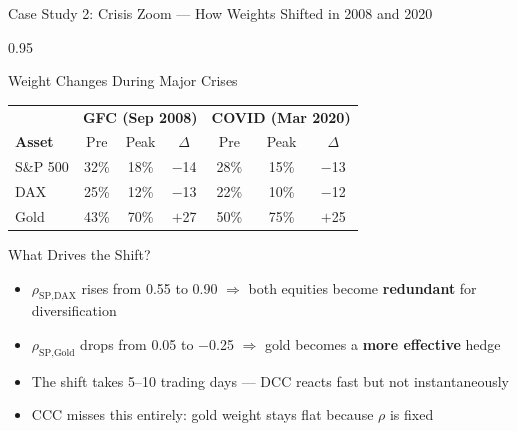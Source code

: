 \documentclass[9pt, aspectratio=169, t]{beamer}
\begin{document}
\begin{frame}{Case Study 2: Crisis Zoom --- How Weights Shifted in 2008 and 2020}
    \begin{cminipage}{0.95\textwidth}
    {\footnotesize
    \begin{block}{Weight Changes During Major Crises}
        \vspace{0.1cm}
        {\small
        \begin{center}
        \begin{tabular}{l|ccc|ccc}
            \hline
            & \multicolumn{3}{c|}{\textbf{GFC (Sep 2008)}} & \multicolumn{3}{c}{\textbf{COVID (Mar 2020)}} \\
            \textbf{Asset} & Pre & Peak & $\Delta$ & Pre & Peak & $\Delta$ \\
            \hline
            S\&P 500 & 32\% & 18\% & $-$14 & 28\% & 15\% & $-$13 \\
            DAX      & 25\% & 12\% & $-$13 & 22\% & 10\% & $-$12 \\
            Gold     & 43\% & 70\% & $+$27 & 50\% & 75\% & $+$25 \\
            \hline
        \end{tabular}
        \end{center}
        }
    \end{block}
    \begin{alertblock}{What Drives the Shift?}
        \begin{itemize}\setlength{\itemsep}{0pt}
            \item $\rho_{\text{SP,DAX}}$ rises from 0.55 to 0.90 $\Rightarrow$ both equities become \textbf{redundant} for diversification
            \item $\rho_{\text{SP,Gold}}$ drops from 0.05 to $-$0.25 $\Rightarrow$ gold becomes a \textbf{more effective} hedge
            \item The shift takes 5--10 trading days --- DCC reacts fast but not instantaneously
            \item CCC misses this entirely: gold weight stays flat because $\rho$ is fixed
        \end{itemize}
    \end{alertblock}
    }
    \end{cminipage}
\end{frame}
\end{document}
